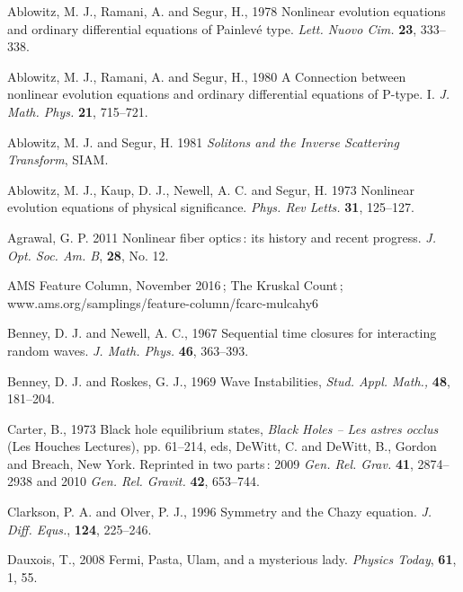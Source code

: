 \documentclass[11pt]{article}
\begin{document}

\begin{thebibliography}{30}\itemsep -1mm
\scriptsize

Ablowitz, M. J., Ramani, A. and Segur, H., 1978 Nonlinear evolution equations and ordinary differential equations of Painlev\'e type. 
\textit{Lett. Nuovo Cim.} \textbf{23}, 333--338. 

Ablowitz, M. J., Ramani, A. and Segur, H., 1980 A Connection between nonlinear evolution equations and ordinary differential equations 
of P-type. I. \textit{J. Math. Phys.} \textbf{21}, 715--721.

 Ablowitz, M. J. and Segur, H. 1981 \textit{Solitons and the Inverse Scattering Transform}, SIAM.

 Ablowitz, M. J., Kaup, D. J., Newell, A. C. and Segur, H. 1973 Nonlinear evolution equations of physical 
significance.  \textit{Phys. Rev Letts.} \textbf{31}, 125--127.

 Agrawal, G. P. 2011 Nonlinear fiber optics\,: its history and recent progress.  \textit{J. Opt. Soc. Am. B}, 
\textbf{28}, No. 12. 

 AMS Feature Column, November 2016\,; The Kruskal Count\,; www.ams.org/samplings/feature-column/fcarc-mulcahy6


 Benney, D. J. and Newell, A. C., 1967 Sequential time closures for interacting random waves. 
\textit{J. Math. Phys.} \textbf{46}, 363--393.

 Benney, D. J. and Roskes, G. J., 1969 Wave Instabilities, \textit{Stud. Appl. Math.,} \textbf{48}, 181--204.

 Carter, B., 1973 Black hole equilibrium states, \textit{Black Holes -- Les astres occlus} (Les Houches Lectures), 
pp. 61--214, eds, DeWitt, C. and DeWitt, B., Gordon and Breach, New York. Reprinted in two parts\,: 2009 \textit{Gen. Rel. Grav.} 
\textbf{41}, 2874--2938 and 2010 \textit{Gen. Rel. Gravit.} \textbf{42}, 653--744.

 Clarkson, P. A. and Olver, P. J., 1996 Symmetry and the Chazy equation. \textit{J. Diff. Equs.}, \textbf{124}, 225--246.

 Dauxois, T., 2008 Fermi, Pasta, Ulam, and a mysterious lady. \textit{Physics Today}, \textbf{61}, 1, 55.


\end{thebibliography}
\end{document}
